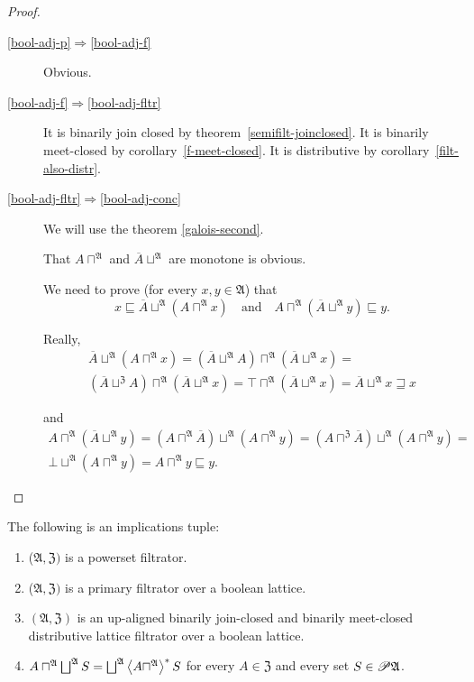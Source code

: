 \begin{proof}
~
\begin{description}
\item [{\ref{bool-adj-p}$\Rightarrow$\ref{bool-adj-f}}] Obvious.
\item [{\ref{bool-adj-f}$\Rightarrow$\ref{bool-adj-fltr}}] It is binarily join closed by theorem~\ref{semifilt-joinclosed}.
It is binarily meet-closed by corollary~\ref{f-meet-closed}. It is distributive by
corollary~\ref{filt-also-distr}.
\item [{\ref{bool-adj-fltr}$\Rightarrow$\ref{bool-adj-conc}}] We will
use the theorem \ref{galois-second}.


That $A\sqcap^{\mathfrak{A}}$ and $\overline{A}\sqcup^{\mathfrak{A}}$
are monotone is obvious.


We need to prove (for every $x,y\in\mathfrak{A}$) that
\[
x\sqsubseteq\overline{A}\sqcup^{\mathfrak{A}}(A\sqcap^{\mathfrak{A}}x)\quad\text{and}\quad A\sqcap^{\mathfrak{A}}(\overline{A}\sqcup^{\mathfrak{A}}y)\sqsubseteq y.
\]



Really,
\begin{multline*}
\overline{A}\sqcup^{\mathfrak{A}}(A\sqcap^{\mathfrak{A}}x)=(\overline{A}\sqcup^{\mathfrak{A}}A)\sqcap^{\mathfrak{A}}(\overline{A}\sqcup^{\mathfrak{A}}x)=\\
(\overline{A}\sqcup^{\mathfrak{Z}}A)\sqcap^{\mathfrak{A}}(\overline{A}\sqcup^{\mathfrak{A}}x)=\top\sqcap^{\mathfrak{A}}(\overline{A}\sqcup^{\mathfrak{A}}x)=\overline{A}\sqcup^{\mathfrak{A}}x\sqsupseteq x
\end{multline*}



and
\begin{multline*}
A\sqcap^{\mathfrak{A}}(\overline{A}\sqcup^{\mathfrak{A}}y)=(A\sqcap^{\mathfrak{A}}\overline{A})\sqcup^{\mathfrak{A}}(A\sqcap^{\mathfrak{A}}y)=(A\sqcap^{\mathfrak{Z}}\overline{A})\sqcup^{\mathfrak{A}}(A\sqcap^{\mathfrak{A}}y)=\\
\bot\sqcup^{\mathfrak{A}}(A\sqcap^{\mathfrak{A}}y)=A\sqcap^{\mathfrak{A}}y\sqsubseteq y.
\end{multline*}


\end{description}
\end{proof}
\begin{thm}
\label{b-f-back-distr}The following is an implications tuple:
\begin{enumerate}
\item \label{f-back-distr-p}($\mathfrak{A},\mathfrak{Z})$ is a powerset filtrator.
\item \label{f-back-distr-f}($\mathfrak{A},\mathfrak{Z})$ is a primary filtrator over
a boolean lattice.
\item \label{f-back-distr-fltr}$(\mathfrak{A},\mathfrak{Z})$ is an up-aligned
binarily join-closed and binarily meet-closed distributive lattice
filtrator over a boolean lattice.
\item \label{f-back-distr-conc}$A\sqcap^{\mathfrak{A}}\bigsqcup^{\mathfrak{A}}S=\bigsqcup^{\mathfrak{A}}\rsupfun{A\sqcap^{\mathfrak{A}}}S$
for every $A\in\mathfrak{Z}$ and every set $S\in\mathscr{P}\mathfrak{A}$.
\end{enumerate}
\end{thm}
